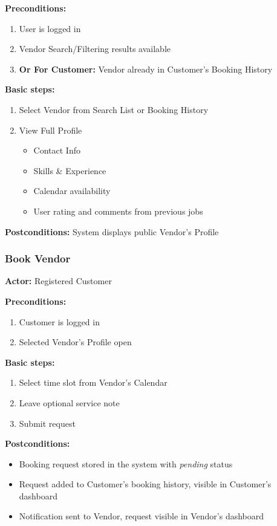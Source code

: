 \documentclass[11pt,a4paper]{article}
\begin{document}
\noindent \textbf{Preconditions:}
\begin{enumerate}
  \item User is logged in
  \item Vendor Search/Filtering results available
  \item \textbf{Or For Customer:} Vendor already in Customer's Booking History
\end{enumerate}

\noindent \textbf{Basic steps:}
\begin{enumerate}
  \item Select Vendor from Search List or Booking History
  \item View Full Profile
    \begin{itemize}
      \item Contact Info
      \item Skills \& Experience
      \item Calendar availability
      \item User rating and comments from previous jobs
    \end{itemize}
\end{enumerate}

\noindent \textbf{Postconditions:} System displays public Vendor's Profile

\subsubsection{Book Vendor}

\textbf{Actor:} Registered Customer

\noindent \textbf{Preconditions:}
\begin{enumerate}
  \item Customer is logged in
  \item Selected Vendor's Profile open
\end{enumerate}

\noindent \textbf{Basic steps:}
\begin{enumerate}
  \item Select time slot from Vendor's Calendar
  \item Leave optional service note
  \item Submit request
\end{enumerate}

\noindent \textbf{Postconditions:}
\begin{itemize}
  \item Booking request stored in the system with \textit{pending} status
  \item Request added to Customer's booking history, visible in
    Customer's dashboard
  \item Notification sent to Vendor, request visible in Vendor's dashboard
\end{itemize}
\end{document}
